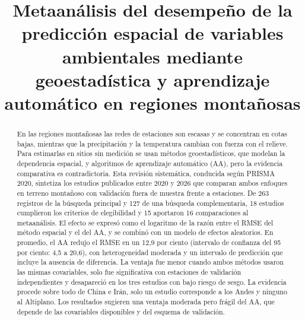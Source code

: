 \documentclass[conference]{IEEEtran}
\begin{document}
\title{Metaanálisis del desempeño de la predicción espacial de variables ambientales mediante geoestadística y aprendizaje automático en regiones montañosas}

\author{
\and
{}
\and
{}
\and
{}
}

\maketitle

\begin{abstract}
En las regiones montañosas las redes de estaciones son escasas y se concentran en cotas bajas, mientras que la precipitación y la temperatura cambian con fuerza con el relieve. Para estimarlas en sitios sin medición se usan métodos geoestadísticos, que modelan la dependencia espacial, y algoritmos de aprendizaje automático (AA), pero la evidencia comparativa es contradictoria. Esta revisión sistemática, conducida según PRISMA 2020, sintetiza los estudios publicados entre 2020 y 2026 que comparan ambos enfoques en terreno montañoso con validación fuera de muestra frente a estaciones. De 263 registros de la búsqueda principal y 127 de una búsqueda complementaria, 18 estudios cumplieron los criterios de elegibilidad y 15 aportaron 16 comparaciones al metaanálisis. El efecto se expresó como el logaritmo de la razón entre el RMSE del método espacial y el del AA, y se combinó con un modelo de efectos aleatorios. En promedio, el AA redujo el RMSE en un 12,9 por ciento (intervalo de confianza del 95 por ciento: 4,5 a 20,6), con heterogeneidad moderada y un intervalo de predicción que incluye la ausencia de diferencia. La ventaja fue menor cuando ambos métodos usaron las mismas covariables, solo fue significativa con estaciones de validación independientes y desapareció en los tres estudios con bajo riesgo de sesgo. La evidencia procede sobre todo de China e Irán, solo un estudio corresponde a los Andes y ninguno al Altiplano. Los resultados sugieren una ventaja moderada pero frágil del AA, que depende de las covariables disponibles y del esquema de validación.
\end{abstract}
\end{document}
